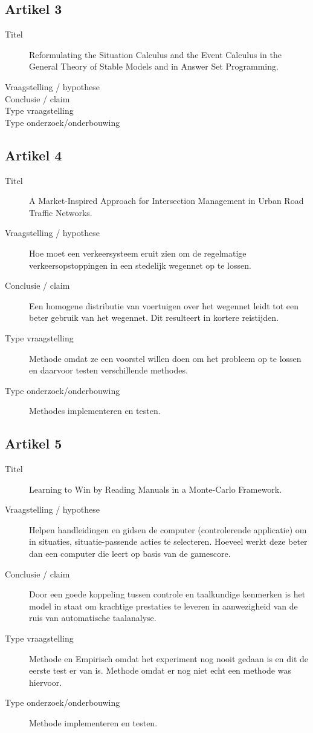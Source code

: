 \documentclass{article}
\begin{document}
\subsection{Artikel 3}
\begin{description}
\item[Titel] Reformulating the Situation Calculus and the Event Calculus in the General Theory of Stable Models and in Answer Set Programming.
\item[Vraagstelling / hypothese] 
\item[Conclusie / claim] 
\item[Type vraagstelling]
\item[Type onderzoek/onderbouwing]
\end{description}

\subsection{Artikel 4}
\begin{description}
\item[Titel] A Market-Inspired Approach for Intersection Management in Urban Road Traffic Networks.
\item[Vraagstelling / hypothese] Hoe moet een verkeersysteem eruit zien om de regelmatige verkeersopstoppingen in een stedelijk wegennet op te lossen.
\item[Conclusie / claim]  Een homogene distributie van voertuigen over het wegennet leidt tot een beter gebruik van het wegennet. Dit resulteert in kortere reistijden.
\item[Type vraagstelling] Methode omdat ze een voorstel willen doen om het probleem op te lossen en daarvoor testen verschillende methodes.
\item[Type onderzoek/onderbouwing] Methodes implementeren en testen.
\end{description}

\subsection{Artikel 5}
\begin{description}
\item[Titel] Learning to Win by Reading Manuals in a Monte-Carlo Framework.
\item[Vraagstelling / hypothese] Helpen handleidingen en gidsen de computer (controlerende applicatie) om in situaties, situatie-passende acties te selecteren. Hoeveel werkt deze beter dan een computer die leert op basis van de gamescore.
\item[Conclusie / claim] Door een goede koppeling tussen controle en taalkundige kenmerken is het model in staat om krachtige prestaties te leveren in aanwezigheid van de ruis van automatische taalanalyse.
\item[Type vraagstelling] Methode en Empirisch omdat het experiment nog nooit gedaan is en dit de eerste test er van is. Methode omdat er nog niet echt een methode was hiervoor.
\item[Type onderzoek/onderbouwing] Methode implementeren en testen.
\end{description}
\end{document}
